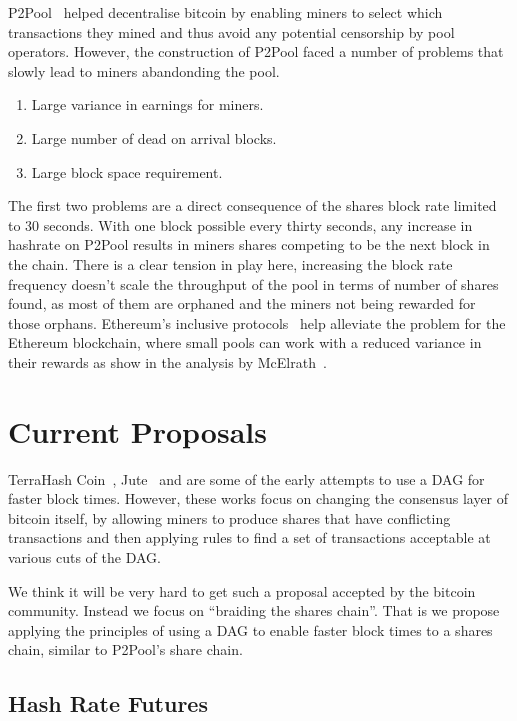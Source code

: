 \documentclass{article}
\begin{document}
P2Pool~\cite{p2pool:wiki} helped decentralise bitcoin by enabling
miners to select which transactions they mined and thus avoid any
potential censorship by pool operators. However, the construction of
P2Pool faced a number of problems that slowly lead to miners
abandonding the pool.

\begin{enumerate}
  \item Large variance in earnings for miners.
  \item Large number of dead on arrival blocks.
  \item Large block space requirement.
\end{enumerate}

The first two problems are a direct consequence of the shares block
rate limited to 30 seconds. With one block possible every thirty
seconds, any increase in hashrate on P2Pool results in miners shares
competing to be the next block in the chain. There is a clear tension
in play here, increasing the block rate frequency doesn't scale the
throughput of the pool in terms of number of shares found, as most of
them are orphaned and the miners not being rewarded for those
orphans. Ethereum's inclusive protocols~\cite{inclusive-protocols}
help alleviate the problem for the Ethereum blockchain, where small
pools can work with a reduced variance in their
rewards as show in the analysis by McElrath~\cite{mcelrath:variance}.


\section{Current Proposals}

TerraHash Coin~\cite{mcelrath:variance}, Jute~\cite{jute} and
\cite{spectre} are some of the early attempts to use a DAG for faster
block times. However, these works focus on changing the consensus
layer of bitcoin itself, by allowing miners to produce shares that
have conflicting transactions and then applying rules to find a set of
transactions acceptable at various cuts of the DAG.\

We think it will be very hard to get such a proposal accepted by the
bitcoin community. Instead we focus on ``braiding the shares
chain''. That is we propose applying the principles of using a DAG to
enable faster block times to a shares chain, similar to P2Pool's share
chain.

\subsection{Hash Rate Futures}
\end{document}
